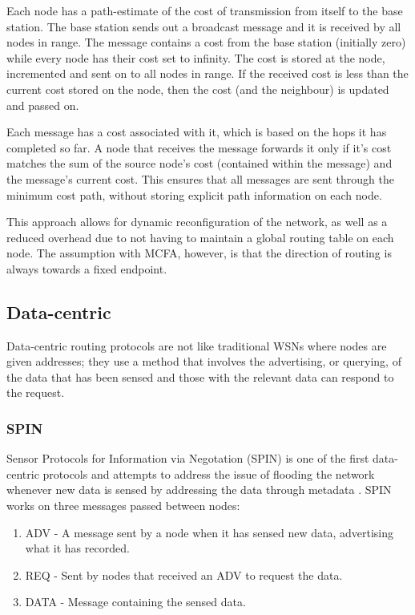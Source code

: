 Each node has a path-estimate of the cost of transmission from itself to the base station. The base station sends out a broadcast message and it is received by all nodes in range. The message contains a cost from the base station (initially zero) while every node has their cost set to infinity. The cost is stored at the node, incremented and sent on to all nodes in range. If the received cost is less than the current cost stored on the node, then the cost (and the neighbour) is updated and passed on.

Each message has a cost associated with it, which is based on the hops it has completed so far. A node that receives the message forwards it only if it's cost matches the sum of the source node's cost (contained within the message) and the message's current cost. This ensures that all messages are sent through the minimum cost path, without storing explicit path information on each node.

	This approach allows for dynamic reconfiguration of the network, as well as a reduced overhead due to not having to maintain a global routing table on each node. The assumption with MCFA, however, is that the direction of routing is always towards a fixed endpoint.

\subsection{Data-centric}
	Data-centric routing protocols are not like traditional WSNs where nodes are given addresses; they use a method that involves the advertising, or querying, of the data that has been sensed and those with the relevant data can respond to the request.

\subsubsection{SPIN}
	Sensor Protocols for Information via Negotation (SPIN)  is one of the first data-centric protocols and attempts to address the issue of flooding the network whenever new data is sensed by addressing the data through metadata \cite{Heinzelman1999}. SPIN works on three messages passed between nodes:
	\begin{enumerate}
		\item ADV - A message sent by a node when it has sensed new data, advertising what it has recorded.
		\item REQ - Sent by nodes that received an ADV to request the data.
		\item DATA - Message containing the sensed data.
	\end{enumerate}


